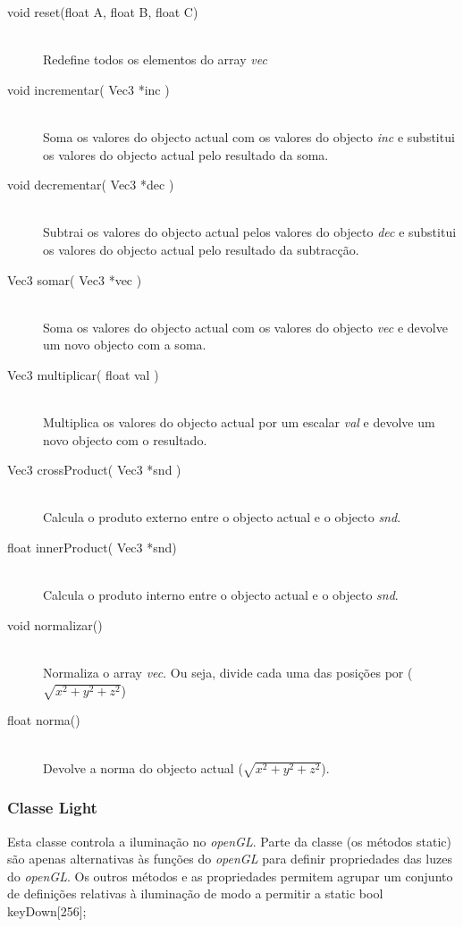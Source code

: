 \documentclass[a5paper,onecolumn, 11pt]{article}
\begin{document}
\begin{description}
	\item[void reset(float A, float B, float C)] \hfill \\
	Redefine todos os elementos do array \textit{vec}
	
	\item[void incrementar( Vec3 *inc )] \hfill \\
	Soma os valores do objecto actual com os valores do objecto \textit{inc} e substitui os valores do objecto actual pelo resultado da soma.
	
	\item[void decrementar( Vec3 *dec )] \hfill \\
	Subtrai os valores do objecto actual pelos valores do objecto \textit{dec} e substitui os valores do objecto actual pelo resultado da subtracção.
	
	\item[Vec3 somar( Vec3 *vec )] \hfill \\
	Soma os valores do objecto actual com os valores do objecto \textit{vec} e devolve um novo objecto com a soma.
	
	\item[Vec3 multiplicar( float val )] \hfill \\
	Multiplica os valores do objecto actual por um escalar \textit{val} e devolve um novo objecto com o resultado.
	
	\item[Vec3 crossProduct( Vec3 *snd )] \hfill \\
	Calcula o produto externo entre o objecto actual e o objecto \textit{snd}.
	
	\item[float innerProduct( Vec3 *snd)] \hfill \\
	Calcula o produto interno entre o objecto actual e o objecto \textit{snd}.
	
	\item[void normalizar()] \hfill \\
	Normaliza o array \textit{vec}. Ou seja, divide cada uma das posições por ($\sqrt{x^{2}+y^{2}+z^{2}}$)
	
	\item[float norma()] \hfill \\
	Devolve a norma do objecto actual ($\sqrt{x^{2}+y^{2}+z^{2}}$).
\end{description}

\clearpage
\subsubsection{Classe Light} \label{classe light}
Esta classe controla a iluminação no \textit{openGL}. Parte da classe (os métodos static) são apenas alternativas às funções do \textit{openGL} para definir propriedades das luzes do \textit{openGL}. Os outros métodos e as propriedades permitem agrupar um conjunto de definições relativas à iluminação de modo a permitir a	static bool keyDown[256];
\end{document}
